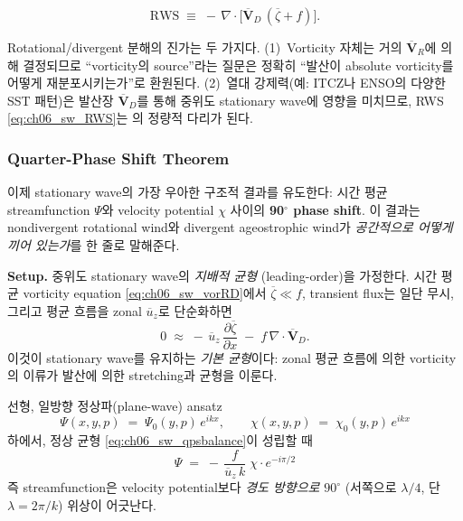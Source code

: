 \begin{equation}\label{eq:ch06_sw_RWS}
  \mathrm{RWS} \;\equiv\; -\,\nabla\!\cdot\!\bigl[\overline{\mathbf{V}}_D\,(\overline{\zeta}+f)\bigr] .
\end{equation}

\begin{remark}\label{rem:ch06_sw_whydecomp}
Rotational/divergent 분해의 진가는 두 가지다.
(1)~Vorticity 자체는 거의 $\overline{\mathbf{V}}_R$에 의해 결정되므로 ``vorticity의 source''라는
질문은 정확히 ``발산이 absolute vorticity를 어떻게 재분포시키는가''로 환원된다.
(2)~열대 강제력(예: ITCZ나 ENSO의 다양한 SST 패턴)은 발산장 $\overline{\mathbf{V}}_D$를 통해
중위도 stationary wave에 영향을 미치므로,
RWS \eqref{eq:ch06_sw_RWS}는 의 정량적 다리가 된다.
\end{remark}

\subsubsection{Quarter-Phase Shift Theorem}\label{subsubsec:ch06_sw_qps}

이제 stationary wave의 가장 우아한 구조적 결과를 유도한다:
시간 평균 streamfunction $\Psi$와 velocity potential $\chi$ 사이의 \textbf{90$^\circ$ phase shift}.
이 결과는 nondivergent rotational wind와 divergent ageostrophic wind가
\emph{공간적으로 어떻게 끼어 있는가}를 한 줄로 말해준다.

\medskip



\noindent\textbf{Setup.}
중위도 stationary wave의 \emph{지배적 균형} (leading-order)을 가정한다.
시간 평균 vorticity equation \eqref{eq:ch06_sw_vorRD}에서 $\overline{\zeta} \ll f$,
transient flux는 일단 무시, 그리고 평균 흐름을 zonal $\overline{u}_z$로 단순화하면
\begin{equation}\label{eq:ch06_sw_qpsbalance}
  0 \;\approx\; -\,\overline{u}_z\,\frac{\partial \overline{\zeta}}{\partial x}
              \;-\; f\,\nabla\!\cdot\!\overline{\mathbf{V}}_D .
\end{equation}
이것이 stationary wave를 유지하는 \emph{기본 균형}이다:
zonal 평균 흐름에 의한 vorticity의 이류가 발산에 의한 stretching과 균형을 이룬다.

\begin{theorem}\label{thm:ch06_sw_qps}
선형, 일방향 정상파(plane-wave) ansatz
\begin{equation}\label{eq:ch06_sw_ansatz}
  \Psi(x,y,p) \;=\; \Psi_0(y,p)\,e^{ikx},\qquad
  \chi(x,y,p) \;=\; \chi_0(y,p)\,e^{ikx}
\end{equation}
하에서, 정상 균형 \eqref{eq:ch06_sw_qpsbalance}이 성립할 때
\begin{equation}\label{eq:ch06_sw_qps}
  \boxed{\;
  \Psi \;=\; -\,\frac{f}{\overline{u}_z\,k}\;\chi \cdot e^{-i\pi/2}
  \;}
\end{equation}
즉 streamfunction은 velocity potential보다 \emph{경도 방향으로} $90^\circ$
(서쪽으로 $\lambda/4$, 단 $\lambda = 2\pi/k$) 위상이 어긋난다.
\end{theorem}

